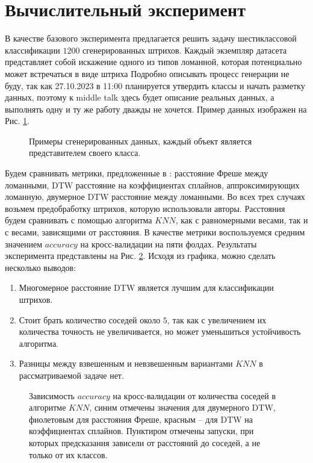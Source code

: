 \documentclass{article}
\begin{document}
\section{Вычислительный эксперимент}
В качестве базового эксперимента предлагается решить задачу шестиклассовой классификации $1200$ сгенерированных штрихов. Каждый экземпляр датасета представляет собой искажение одного из типов ломанной, которая потенциально может встречаться в виде штриха Подробно описывать процесс генерации не буду, так как 27.10.2023 в 11:00 планируется утвердить классы и начать разметку данных, поэтому к middle talk здесь будет описание реальных данных, а выполнять одну и ту же работу дважды не хочется. Пример данных изображен на Рис. \ref{img:data_example}.\\
\begin{figure}
\centering
    
    \caption{Примеры сгенерированных данных, каждый объект является представителем своего класса.}
    \label{img:data_example}
\end{figure}
Будем сравнивать метрики, предложенные в \citep{pronina2023frechet, pazazia2023dtw}: расстояние Фреше между ломанными, DTW расстояние на коэффициентах сплайнов, аппроксимирующих ломанную, двумерное DTW расстояние между ломанными. Во всех трех случаях возьмем предобработку штрихов, которую использовали авторы. Расстояния будем сравнивать с помощью алгоритма $KNN$, как с равномерными весами, так и с весами, зависящими от расстояния. В качестве метрики воспользуемся средним значением $accuracy$ на кросс-валидации на пяти фолдах. Результаты эксперимента представлены на Рис. \ref{img:base_results}. Исходя из графика, можно сделать несколько выводов:
\begin{enumerate}
    \item Многомерное расстояние DTW является лучшим для классификации штрихов.
    \item Стоит брать количество соседей около $5$, так как с увеличением их количества точность не увеличивается, но может уменьшиться устойчивость алгоритма.
    \item Разницы между взвешенным и невзвешенным вариантами $KNN$ в рассматриваемой задаче нет.
\end{enumerate}
\begin{figure}
\centering
    
    \caption{Зависимость $accuracy$ на кросс-валидации от количества соседей в алгоритме $KNN$, синим отмечены значения для двумерного DTW, фиолетовым для расстояния Фреше, красным -- для DTW на коэффициентах сплайнов. Пунктиром отмечены запуски, при которых предсказания зависели от расстояний до соседей, а не только от их классов.}
    \label{img:base_results}
\end{figure}
\end{document}
